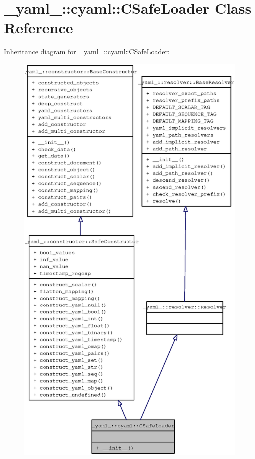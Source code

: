 \section{\_\-yaml\_\-::cyaml::CSafeLoader Class Reference}
\label{class__yaml___1_1cyaml_1_1CSafeLoader}
Inheritance diagram for \_\-yaml\_\-::cyaml::CSafeLoader:\nopagebreak
\begin{figure}[H]
\begin{center}
\leavevmode
\includegraphics[width=400pt]{class__yaml___1_1cyaml_1_1CSafeLoader__inherit__graph}
\end{center}
\end{figure}
